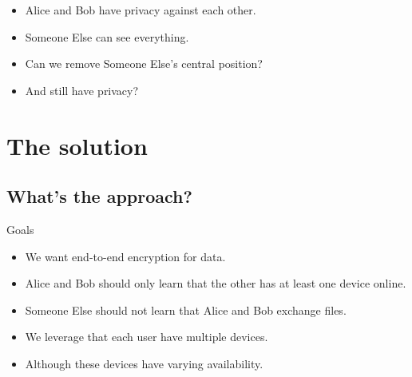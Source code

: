 \begin{frame}
  \begin{remark}
    \begin{itemize}
      \item Alice and Bob have privacy against each other.
      \item Someone Else can see everything.
    \end{itemize}
  \end{remark}

  \pause

  \begin{question}
    \begin{itemize}
      \item Can we remove Someone Else's central position?
      \item And still have privacy?
    \end{itemize}
  \end{question}
\end{frame}


\section{The solution}

\subsection{What's the approach?}

\begin{frame}
  \begin{block}{Goals}
  \begin{itemize}
    \item We want end-to-end encryption for data.
    \item Alice and Bob should only learn that the other has at least one 
      device online.
    \item Someone Else should not learn that Alice and Bob exchange files.
    \end{itemize}
  \end{block}

  \pause

  \begin{idea}
    \begin{itemize}
      \item We leverage that each user have multiple devices.
      \item Although these devices have varying availability.
    \end{itemize}
  \end{idea}
\end{frame}

